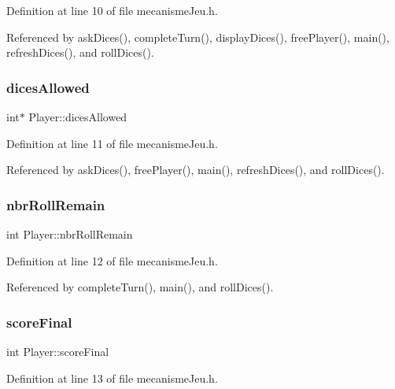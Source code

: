 Definition at line 10 of file mecanisme\+Jeu.\+h.



Referenced by ask\+Dices(), complete\+Turn(), display\+Dices(), free\+Player(), main(), refresh\+Dices(), and roll\+Dices().

\mbox{\label{structPlayer_adb33524b9364f3e0bcfc5bd098cdaaf0}} 
\subsubsection{\texorpdfstring{dices\+Allowed}{dicesAllowed}}
{\footnotesize\ttfamily int$\ast$ Player\+::dices\+Allowed}



Definition at line 11 of file mecanisme\+Jeu.\+h.



Referenced by ask\+Dices(), free\+Player(), main(), refresh\+Dices(), and roll\+Dices().

\mbox{\label{structPlayer_ae4c871b61a2af583a8b5975d736bea5d}} 
\subsubsection{\texorpdfstring{nbr\+Roll\+Remain}{nbrRollRemain}}
{\footnotesize\ttfamily int Player\+::nbr\+Roll\+Remain}



Definition at line 12 of file mecanisme\+Jeu.\+h.



Referenced by complete\+Turn(), main(), and roll\+Dices().

\mbox{\label{structPlayer_a44cb6ebf8f95f9bd12f5985c9e5dfd99}} 
\subsubsection{\texorpdfstring{score\+Final}{scoreFinal}}
{\footnotesize\ttfamily int Player\+::score\+Final}



Definition at line 13 of file mecanisme\+Jeu.\+h.



